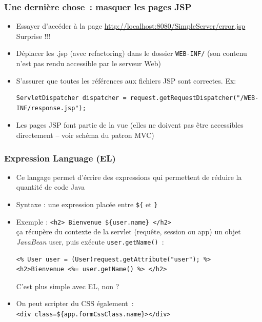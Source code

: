 \documentclass{beamer}
\begin{document}
\begin{frame}[fragile]
	\frametitle{Une dernière chose~: masquer les pages JSP}
	\begin{itemize}
		\item Essayer d'accéder à la page \url{http://localhost:8080/SimpleServer/error.jsp}\\
		Surprise !!!
		\item Déplacer les .jsp (avec refactoring) dans le dossier \texttt{WEB-INF/} (son contenu n'est pas rendu accessible par le serveur Web)
		\item S'assurer que toutes les références aux fichiers JSP sont correctes. Ex:\\
\begin{lstlisting}
ServletDispatcher dispatcher = request.getRequestDispatcher("/WEB-INF/response.jsp");
\end{lstlisting}
		\item Les pages JSP font partie de la vue (elles ne doivent pas être accessibles directement -- voir schéma du patron MVC)
	\end{itemize}
\end{frame}

\begin{frame}[fragile]
	\frametitle{Expression Language (EL)}
	\begin{itemize}
		\item Ce langage permet d'écrire des expressions qui permettent de réduire la quantité de code Java
		\item Syntaxe : une expression placée entre \texttt{\$\{} et \texttt{\}}
		\item Exemple : \texttt{<h2> Bienvenue \$\{user.name\} </h2>}\\
		ça récupère du contexte de la servlet (requête, session ou app) un objet \textit{JavaBean} user, puis exécute \texttt{user.getName()}~:
\begin{lstlisting}
<% User user = (User)request.getAttribute("user"); %>
<h2>Bienvenue <%= user.getName() %> </h2>		
\end{lstlisting}
		C'est plus simple avec EL, non ?
		\item On peut scripter du CSS également~:\\
		\texttt{<div class=\$\{app.formCssClass.name\}></div>}
	\end{itemize}
\end{frame}
\end{document}
